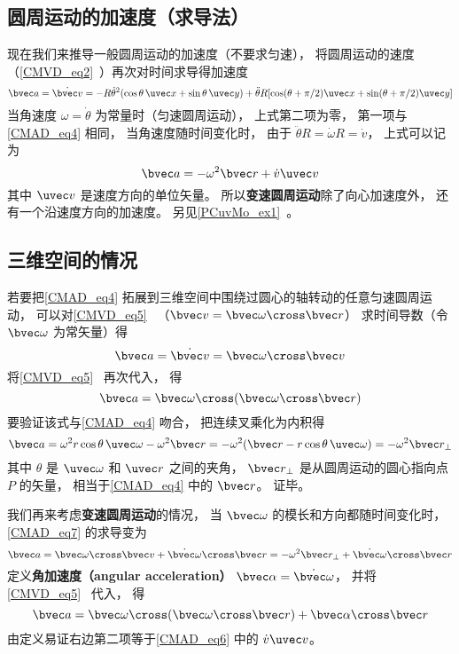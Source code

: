 \subsection{圆周运动的加速度（求导法）}\label{CMAD_sub1}
现在我们来推导一般圆周运动的加速度（不要求匀速），  将圆周运动的速度（\autoref{CMVD_eq2}~）再次对时间求导得加速度
\begin{equation}
\bvec a = \dot {\bvec v} =  - R \dot\theta^2(\cos \theta\, \uvec x + \sin \theta\, \uvec y) + \ddot\theta R [\cos(\theta + \pi/2) \uvec x + \sin(\theta + \pi/2)\uvec y]
\end{equation}
当角速度 $\omega = \dot\theta$ 为常量时（匀速圆周运动）， 上式第二项为零， 第一项与\autoref{CMAD_eq4} 相同， 当角速度随时间变化时， 由于 $\ddot\theta R = \dot\omega R = \dot v$， 上式可以记为
\begin{equation}\label{CMAD_eq6}
\bvec a = - \omega ^2 \bvec r + \dot v \uvec v
\end{equation}
其中 $\uvec v$ 是速度方向的单位矢量。 所以\textbf{变速圆周运动}除了向心加速度外， 还有一个沿速度方向的加速度。 另见\autoref{PCuvMo_ex1}~。

\subsection{三维空间的情况}
若要把\autoref{CMAD_eq4} 拓展到三维空间中围绕过圆心的轴转动的任意匀速圆周运动， 可以对\autoref{CMVD_eq5}~ （$\bvec v = \bvec\omega \cross \bvec r$） 求时间导数（令 $\bvec\omega$ 为常矢量）得
\begin{equation}\label{CMAD_eq7}
\bvec a = \dot{\bvec v} = \bvec\omega \cross \bvec v
\end{equation}
将\autoref{CMVD_eq5}~ 再次代入， 得
\begin{equation}\label{CMAD_eq9}
\bvec a =  \bvec\omega \cross (\bvec\omega \cross \bvec r)
\end{equation}
要验证该式与\autoref{CMAD_eq4} 吻合， 把连续叉乘化为内积得
\begin{equation}
\bvec a = \omega^2 r \cos\theta\, \uvec \omega - \omega^2 \bvec r = -\omega^2 (\bvec r - r\cos\theta\, \uvec\omega) = -\omega^2 \bvec r_\bot
\end{equation}
其中 $\theta$ 是 $\uvec\omega$ 和 $\uvec r$ 之间的夹角， $\bvec r_\bot$ 是从圆周运动的圆心指向点 $P$ 的矢量， 相当于\autoref{CMAD_eq4} 中的 $\bvec r$。 证毕。

我们再来考虑\textbf{变速圆周运动}的情况， 当 $\bvec\omega$ 的模长和方向都随时间变化时， \autoref{CMAD_eq7} 的求导变为
\begin{equation}
\bvec a = \bvec\omega \cross \bvec v + \dot{\bvec\omega} \cross \bvec r = -\omega^2 \bvec r_\bot + \dot{\bvec\omega} \cross \bvec r
\end{equation}
定义\textbf{角加速度（angular acceleration）} $\bvec\alpha = \dot{\bvec\omega}$， 并将\autoref{CMVD_eq5}~ 代入， 得
\begin{equation}\label{CMAD_eq1}
\bvec a =  \bvec\omega \cross (\bvec\omega \cross \bvec r) + \bvec\alpha\cross\bvec r
\end{equation}
由定义易证右边第二项等于\autoref{CMAD_eq6} 中的 $\dot v\uvec v$。
